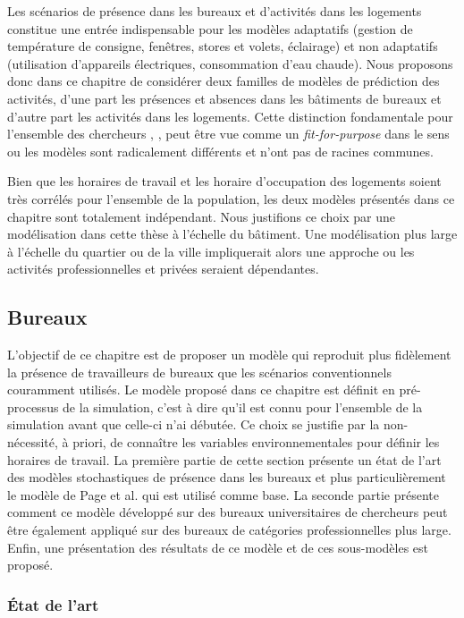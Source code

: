 Les scénarios de présence dans les bureaux et d'activités dans les logements constitue une entrée indispensable pour les modèles adaptatifs (gestion de température de consigne, fenêtres, stores et volets, éclairage) et non adaptatifs (utilisation d'appareils électriques, consommation d'eau chaude). Nous proposons donc dans ce chapitre de considérer deux familles de modèles de prédiction des activités, d'une part les présences et absences dans les bâtiments de bureaux et d'autre part les activités dans les logements. Cette distinction fondamentale pour l'ensemble des chercheurs \cite{Vorger-14}, \cite{Page-08}, \cite{Chapman-14} peut être vue comme un \textit{fit-for-purpose} dans le sens ou les modèles sont radicalement différents et n'ont pas de racines communes.

Bien que les horaires de travail et les horaire d'occupation des logements soient très corrélés pour l'ensemble de la population, les deux modèles présentés dans ce chapitre sont totalement indépendant. Nous justifions ce choix par une modélisation dans cette thèse à l'échelle du bâtiment. Une modélisation plus large à l'échelle du quartier ou de la ville impliquerait alors une approche ou les activités professionnelles et privées seraient dépendantes.

\subsection{Bureaux}

L'objectif de ce chapitre est de proposer un modèle qui reproduit plus fidèlement la présence de travailleurs de bureaux que les scénarios conventionnels couramment utilisés. Le modèle proposé dans ce chapitre est définit en pré-processus de la simulation, c'est à dire qu'il est connu pour l'ensemble de la simulation avant que celle-ci n'ai débutée. Ce choix se justifie par la non-nécessité, à priori, de connaître les variables environnementales pour définir les horaires de travail. La première partie de cette section présente un état de l'art des modèles stochastiques de présence dans les bureaux et plus particulièrement le modèle de Page et al. \cite{Page-08} qui est utilisé comme base. La seconde partie présente comment ce modèle développé sur des bureaux universitaires de chercheurs peut être également appliqué sur des bureaux de catégories professionnelles plus large. Enfin, une présentation des résultats de ce modèle et de ces sous-modèles est proposé.

\subsubsection{État de l'art}

